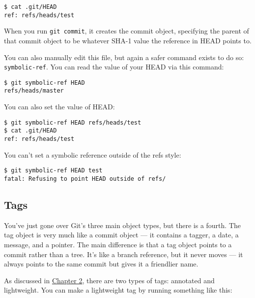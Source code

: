 \documentclass[a4paper]{book}
\newcommand{\prechap}{Chapter }
\newcommand{\postchap}{}
\newcommand{\chapref}[1]{\hyperref[chap:#1]{\prechap #1\postchap}}
\begin{document}
\begin{shaded}\begin{verbatim}
$ cat .git/HEAD
ref: refs/heads/test
\end{verbatim}\end{shaded}

When you run \texttt{git commit}, it creates the commit object, specifying the parent of that commit object to be whatever SHA-1 value the reference in HEAD points to.

You can also manually edit this file, but again a safer command exists to do so: \texttt{symbolic-ref}. You can read the value of your HEAD via this command:

\begin{shaded}\begin{verbatim}
$ git symbolic-ref HEAD
refs/heads/master
\end{verbatim}\end{shaded}

You can also set the value of HEAD:

\begin{shaded}\begin{verbatim}
$ git symbolic-ref HEAD refs/heads/test
$ cat .git/HEAD
ref: refs/heads/test
\end{verbatim}\end{shaded}

You can't set a symbolic reference outside of the refs style:

\begin{shaded}\begin{verbatim}
$ git symbolic-ref HEAD test
fatal: Refusing to point HEAD outside of refs/
\end{verbatim}\end{shaded}

\subsection{Tags}\label{tags}

You've just gone over Git's three main object types, but there is a fourth. The tag object is very much like a commit object --- it contains a tagger, a date, a message, and a pointer. The main difference is that a tag object points to a commit rather than a tree. It's like a branch reference, but it never moves --- it always points to the same commit but gives it a friendlier name.

As discussed in \chapref{2}, there are two types of tags: annotated and lightweight. You can make a lightweight tag by running something like this:
\end{document}
